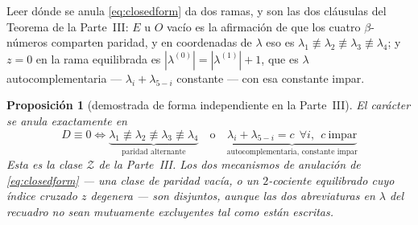 \documentclass[11pt,a4paper]{article}
\newtheorem{proposicion}{Proposici\'on}
\begin{document}
Leer d\'onde se anula \eqref{eq:closedform} da dos ramas, y son las dos cl\'ausulas del Teorema
de la Parte~III: $E$ u $O$ vac\'io es la afirmaci\'on de que los cuatro $\beta$-n\'umeros
comparten paridad, y en coordenadas de $\lambda$ eso es
$\lambda_1\not\equiv\lambda_2\not\equiv\lambda_3\not\equiv\lambda_4$; y $z=0$ en la rama
equilibrada es $|\lambda^{(0)}|=|\lambda^{(1)}|+1$, que es $\lambda$ autocomplementaria ---
$\lambda_i+\lambda_{5-i}$ constante --- con esa constante impar.

\begin{proposicion}[demostrada de forma independiente en la Parte~III]\label{cor:Z}
El car\'acter se anula exactamente en
\begin{equation}\label{eq:zerolocus}
\boxed{\;
D\equiv0
\iff
\underbrace{\lambda_1\not\equiv\lambda_2\not\equiv\lambda_3\not\equiv\lambda_4}_{\text{paridad alternante}}
\quad\text{o}\quad
\underbrace{\lambda_i+\lambda_{5-i}=c\ \ \forall i,\ \ c\ \text{impar}}_{\text{autocomplementaria, constante impar}}\;}
\end{equation}
Esta es la clase $\mathcal Z$ de la Parte~III. Los dos mecanismos de anulaci\'on de
\eqref{eq:closedform} --- una clase de paridad vac\'ia, o un $2$-cociente equilibrado cuyo
\'indice cruzado $z$ degenera --- son disjuntos, aunque las dos abreviaturas en $\lambda$ del
recuadro no sean mutuamente excluyentes tal como est\'an escritas.
\end{proposicion}
\end{document}
